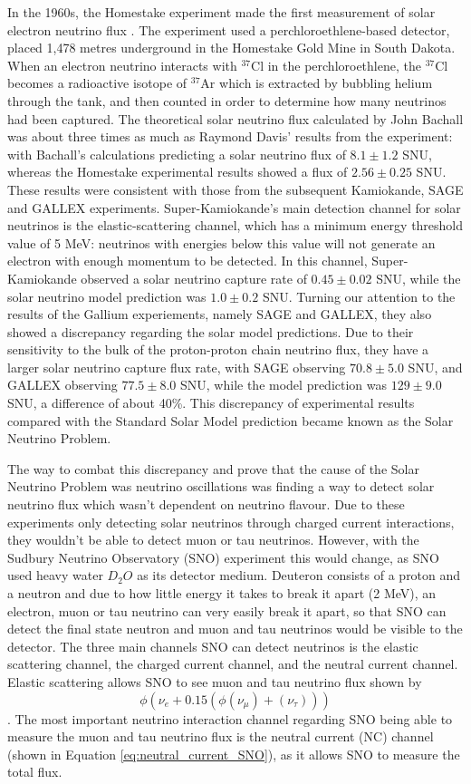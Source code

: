 In the 1960s, the Homestake experiment made the first measurement of solar electron neutrino flux \cite{homestake_davis}. The experiment used a perchloroethlene-based detector, placed 1,478 metres underground in the Homestake Gold Mine in South Dakota. When an electron neutrino interacts with ${ }^{37} \mathrm{Cl}$ in the perchloroethlene, the ${ }^{37} \mathrm{Cl}$ becomes a radioactive isotope of ${ }^{37} \mathrm{Ar}$ which is extracted by bubbling helium through the tank, and then counted in order to determine how many neutrinos had been captured. The theoretical solar neutrino flux calculated by John Bachall was about three times as much as Raymond Davis' results from the experiment: with Bachall's calculations predicting a solar neutrino flux of $8.1 \pm 1.2$ SNU, whereas the Homestake experimental results showed a flux of $2.56 \pm 0.25$ SNU. These results were consistent with those from the subsequent Kamiokande, SAGE and GALLEX experiments. Super-Kamiokande's main detection channel for solar neutrinos is the elastic-scattering channel, which has a minimum energy threshold value of 5 MeV: neutrinos with energies below this value will not generate an electron with enough momentum to be detected. In this channel, Super-Kamiokande observed a solar neutrino capture rate of $0.45 \pm 0.02$ SNU, while the solar neutrino model prediction was $1.0 \pm 0.2$ SNU. Turning our attention to the results of the Gallium experiements, namely SAGE and GALLEX, they also showed a discrepancy regarding the solar model predictions. Due to their sensitivity to the bulk of the proton-proton chain neutrino flux, they have a larger solar neutrino capture flux rate, with SAGE observing $70.8 \pm 5.0$ SNU, and GALLEX observing $77.5 \pm 8.0$ SNU, while the model prediction was $129 \pm 9.0$ SNU, a difference of about 40\%. This discrepancy of experimental results compared with the Standard Solar Model prediction became known as the Solar Neutrino Problem. 

The way to combat this discrepancy and prove that the cause of the Solar Neutrino Problem was neutrino oscillations was finding a way to detect solar neutrino flux which wasn't dependent on neutrino flavour. Due to these experiments only detecting solar neutrinos through charged current interactions, they wouldn't be able to detect muon or tau neutrinos. However, with the Sudbury Neutrino Observatory (SNO) experiment this would change, as SNO used heavy water $D_{2}O$ as its detector medium. Deuteron consists of a proton and a neutron and due to how little energy it takes to break it apart (2 MeV), an electron, muon or tau neutrino can very easily break it apart, so that SNO can detect the final state neutron and muon and tau neutrinos would be visible to the detector. The three main channels SNO can detect neutrinos is the elastic scattering channel, the charged current channel, and the neutral current channel. Elastic scattering allows SNO to see muon and tau neutrino flux shown by $$\phi(\nu_{e} + 0.15(\phi(\nu_{\mu}) + (\nu_{\tau})))$$. The most important neutrino interaction channel regarding SNO being able to measure the muon and tau neutrino flux is the neutral current (NC) channel (shown in Equation \ref{eq:neutral_current_SNO}), as it allows SNO to measure the total flux.

